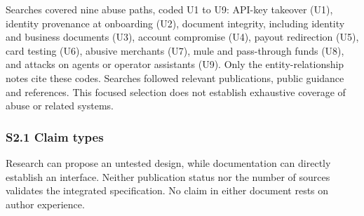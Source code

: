 \documentclass[
  11pt,
]{article}
\begin{document}
Searches covered nine abuse paths, coded U1 to U9: API-key takeover
(U1), identity provenance at onboarding (U2), document integrity,
including identity and business documents (U3), account compromise (U4),
payout redirection (U5), card testing (U6), abusive merchants (U7), mule
and pass-through funds (U8), and attacks on agents or operator
assistants (U9). Only the entity-relationship notes cite these codes.
Searches followed relevant publications, public guidance and references.
This focused selection does not establish exhaustive coverage of abuse
or related systems.

\hypertarget{s2.1-claim-types}{%
\subsubsection{S2.1 Claim types}\label{s2.1-claim-types}}

Research can propose an untested design, while documentation can
directly establish an interface. Neither publication status nor the
number of sources validates the integrated specification. No claim in
either document rests on author experience.
\end{document}

